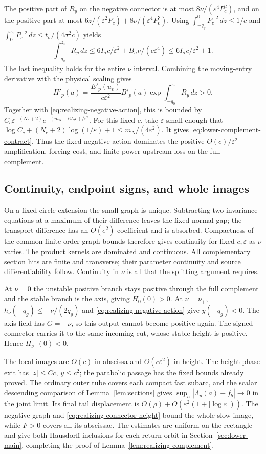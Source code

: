 The positive part of $R_y$ on the negative connector is at most
$8\nu/(\varepsilon^4P_c^2)$, and on the positive part at most
$6z/(\varepsilon^2P_c)+8\nu/(\varepsilon^4P_c^2)$.
Using
$\int_{-q_g}^0P_c^{-2}\,dz\le1/c$ and
$\int_0^{z_v}P_c^{-2}\,dz\le t_\sigma/(4\sigma^2c)$ yields
\begin{equation}\label{eq:realizing-connector-variation}
 \int_{-q_g}^{z_v}R_y\,dz
 \le6I_\sigma c/\varepsilon^2+
                   B_\sigma\nu/(c\varepsilon^4)
 \le6I_\sigma c/\varepsilon^2+1 .
\end{equation}
The last inequality holds for the entire $\nu$ interval.
Combining the moving-entry derivative with the physical scaling gives
\[
 H'_p(a)=\frac{E'_p(u_v)}{c\varepsilon^2}
 B'_p(a)\exp\int_{-q_0}^{z_v}R_y\,dz>0 .
\]
Together with \eqref{eq:realizing-negative-action}, this is bounded
by
$C_c\varepsilon^{-(N_c+2)}
 e^{-(m_N-6I_\sigma c)/\varepsilon^2}$.
For this fixed $c$, take $\varepsilon$ small enough that
$\log C_c+(N_c+2)\log(1/\varepsilon)+1
\le m_N/(4\varepsilon^2)$.
It gives \eqref{eq:lower-complement-contract}.
Thus the fixed negative action dominates the positive
$O(c)/\varepsilon^2$ amplification, forcing cost, and finite-power
upstream loss on the full complement.

\subsection{Continuity, endpoint signs, and whole images}
On a fixed circle extension the small graph is unique.
Subtracting two invariance equations at a maximum of their
difference leaves the fixed normal gap; the transport difference
has an $O(e^2)$ coefficient and is absorbed.
Compactness of the common finite-order graph bounds therefore
gives continuity for fixed $c,\varepsilon$ as $\nu$ varies.
The product kernels are dominated and continuous.
All complementary section hits are finite and transverse;
their parameter continuity and source differentiability follow.
Continuity in $\nu$ is all that the splitting argument requires.

At $\nu=0$ the unstable positive branch stays positive through
the full complement and the stable branch is the axis, giving
$H_0(0)>0$. At $\nu=\nu_+$,
$h_\nu(-q_g)\le-\nu/(2q_g)$ and
\eqref{eq:realizing-negative-action} give $y(-q_g)<0$.
The axis field has $G=-\nu$, so this output cannot become
positive again. The signed connector carries it to the same incoming
cut, whose stable height is positive.
Hence $H_{\nu_+}(0)<0$.

The local images are $O(c)$ in abscissa and
$O(c\varepsilon^2)$ in height. The height-phase exit has
$|z|\le Cc$, $y\le c^2$; the parabolic passage has the fixed
bounds already proved. The ordinary outer tube covers each
compact fast subarc, and the scalar descending comparison of
Lemma~\ref{lem:sections} gives
$\sup_a|\Lambda_p(a)-f_b|\to0$ in the joint limit.
Its final tail displacement is
$O(\rho)+O(\varepsilon^2(1+|\log\varepsilon|))$.
The negative graph and \eqref{eq:realizing-connector-height}
bound the whole slow image, while $F>0$ covers all its
abscissae. The estimates are uniform on the rectangle and give
both Hausdorff inclusions for each return orbit in
Section~\ref{sec:lower-main}, completing the proof of
Lemma~\ref{lem:realizing-complement}.
